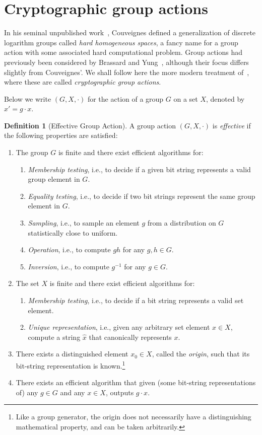 \documentclass[10pt]{article}
\theoremstyle{plain}
\theoremstyle{definition}
\newtheorem{definition}[theorem]{Definition}
\begin{document}
\section{Cryptographic group actions}
\label{sec:crypt-group-acti}

In his seminal unpublished work~\cite{EPRINT:Couveignes06}, Couveignes
defined a generalization of discrete logarithm groups called
\emph{hard homogeneous spaces}, a fancy name for a group action with
some associated hard computational problem. %
Group actions had previously been considered by Brassard and
Yung~\cite{C:BraYun90}, although their focus differs slightly from
Couveignes'. %
We shall follow here the more modern treatment of~\cite{AC:ADMP20},
where these are called \emph{cryptographic group actions}.

Below we write $(G,X,·)$ for the action of a group $G$ on a set
$X$, denoted by $x' = g·x$.

\begin{definition}[Effective Group Action]
  A group action $(G,X,·)$ is \emph{effective} if the following
  properties are satisfied:
  \begin{enumerate}
  \item The group $G$ is finite and there exist efficient algorithms
    for:
    \begin{enumerate}
    \item \emph{Membership testing}, i.e., to decide if a given bit string
      represents a valid group element in $G$.
    \item \emph{Equality testing}, i.e., to decide if two bit strings
      represent the same group element in $G$.
    \item \emph{Sampling}, i.e., to sample an element $g$ from a
      distribution on $G$ statistically close to uniform.
    \item \emph{Operation}, i.e., to compute $gh$ for any $g,h\in G$.
    \item \emph{Inversion}, i.e., to compute $g^{-1}$ for any
      $g\in G$.
    \end{enumerate}
  \item The set $X$ is finite and there exist efficient algorithms for:
    \begin{enumerate}
    \item \emph{Membership testing}, i.e., to decide if a bit string
      represents a valid set element.
    \item \emph{Unique representation}, i.e., given any arbitrary set element $x\in X$, compute a string $\hat{x}$ that canonically represents $x$.
    \end{enumerate}
  \item There exists a distinguished element $x_0\in X$, called the
    \emph{origin}, such that its bit-string representation is
    known.\footnote{Like a group generator, the origin does not
      necessarily have a distinguishing mathematical property, and can
      be taken arbitrarily.}
  \item There exists an efficient algorithm that given (some
    bit-string representations of) any $g\in G$ and any $x\in X$,
    outputs $g · x$.
  \end{enumerate}
\end{definition}
\end{document}

